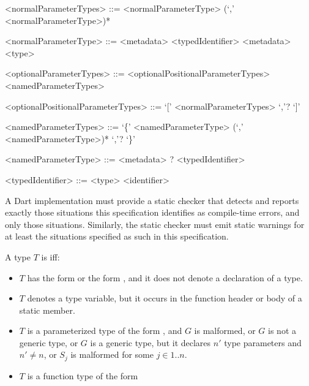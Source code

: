 \documentclass[makeidx]{article}
\begin{document}
{\begin{grammar}
<normalParameterTypes> ::= \gnewline{}
  <normalParameterType> (`,' <normalParameterType>)*

<normalParameterType> ::= <metadata> <typedIdentifier>
  \alt <metadata> <type>

<optionalParameterTypes> ::= <optionalPositionalParameterTypes>
  \alt <namedParameterTypes>

<optionalPositionalParameterTypes> ::= `[' <normalParameterTypes> `,'? `]'

<namedParameterTypes> ::=
  `\{' <namedParameterType> (`,' <namedParameterType>)* `,'? `\}'

<namedParameterType> ::=
  <metadata> \REQUIRED? <typedIdentifier>

<typedIdentifier> ::= <type> <identifier>
\end{grammar}

\LMHash{}%
A Dart implementation must provide a static checker that detects and reports
exactly those situations this specification identifies as compile-time errors,
and only those situations.
Similarly, the static checker must emit static warnings
for at least the situations specified as such in this specification.


\LMHash{}%
A type $T$ is  if{}f:
\begin{itemize}
\item
  $T$ has the form \id{} or the form ,
  and it does not denote a declaration of a type.
\item
  $T$ denotes a type variable,
  but it occurs in the function header or body of a static member.
\item
  $T$ is a parameterized type of the form ,
  and $G$ is malformed,
  or $G$ is not a generic type,
  or $G$ is a generic type,
  but it declares $n'$ type parameters and $n' \not= n$,
  or $S_j$ is malformed for some $j \in 1 .. n$.
\item
  $T$ is a function type of the form



\end{itemize}}
\end{document}
